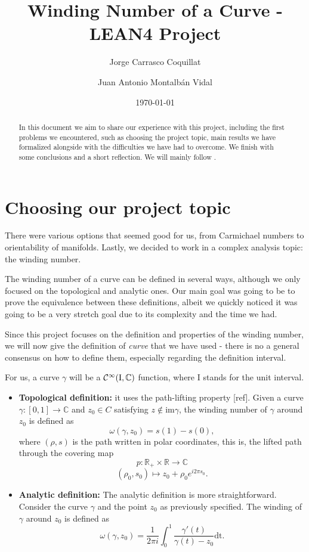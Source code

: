 \documentclass[a4paper,12pt]{article}
\title{Winding Number of a Curve - LEAN4 Project}
\author{Jorge Carrasco Coquillat \and
Juan Antonio Montalbán Vidal}
\date{\today} %
\begin{document}
\maketitle

\begin{abstract}
In this document we aim to share our experience with this project, including the first problems we encountered,
such as choosing the project topic, main results we have formalized alongside with the difficulties we have had to
overcome. We finish with some conclusions and a short reflection. We will mainly follow \cite{COB22}.
\end{abstract}

\section{Choosing our project topic}
There were various options that seemed good for us, from Carmichael numbers
to orientability of manifolds. Lastly, we decided to work in a complex analysis topic:
the winding number.

The winding number of a curve can be defined in several ways, although we only
focused on the topological and analytic ones. Our main goal was going to be
to prove the equivalence between these definitions, albeit we quickly noticed
it was going to be a very stretch goal due to its complexity and the time we had.

Since this project focuses on the definition and properties of the winding number,
we will now give the definition of \textit{curve} that we have used - there is no a general
consensus on how to define them, especially regarding the definition interval.

For us, a curve $\gamma$ will be a $\cal{C}^1 (\text{I}, \mathbb{C})$ function, where I stands for the unit interval.

\begin{itemize}
  \item \textbf{Topological definition:} it uses the path-lifting property [ref]. Given
  a curve $\gamma : [0, 1] \to \mathbb{C}$ and $z_0 \in C$ satisfying $z \notin \text{im} \gamma$, the winding
  number of $\gamma$ around $z_0$ is defined as
  $$\omega (\gamma, z_0) = s(1) - s(0),$$
  where $(\rho, s)$ is the path written in polar coordinates, this is, the lifted path
  through the covering map
  $$p : \mathbb{R}_+ \times \mathbb{R} \to \mathbb{C}$$
  $$(\rho_0, s_0) \mapsto z_0 + \rho_0 e^{i2\pi s_0}.$$
  \item \textbf{Analytic definition:} The analytic definition is more straightforward. Consider the curve $\gamma$
  and the point $z_0$ as previously specified. The winding of $\gamma$ around $z_0$ is defined as
  $$\omega(\gamma, z_0) = \frac{1}{2\pi i} \int_{0}^{1} {\frac{\gamma'(t)}{\gamma(t)-z_0} \text{dt}}.$$
\end{itemize}
\end{document}
